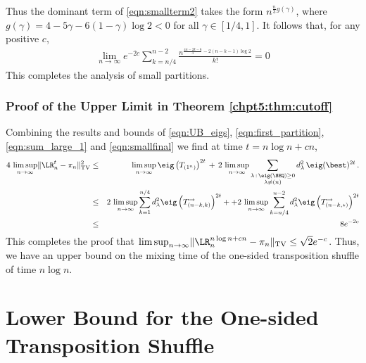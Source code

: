 \documentclass[11pt]{report}
\begin{document}
Thus the dominant term 
of \eqref{eqn:smallterm2} takes the form $n^{\frac{n}{3}g(\gamma)}$,
where $g(\gamma) = 4-5\gamma - 6(1-\gamma)\log 2 < 0$ for all
$\gamma\in[1/4,1]$. It follows that, for any positive $c$, 
\begin{eqnarray}
\lim_{n\rightarrow \infty} e^{-2c}\sum_{k =n/4}^{n-2} 
\frac{n^{\frac{4n-2k-6}{3}-2(n-k-1)\log 2}}{k!} =0 \label{eqn:smallfinal}
\end{eqnarray}	
This completes the analysis of small partitions.


\subsubsection*{Proof of the Upper Limit in Theorem \ref{chpt5:thm:cutoff}}
Combining the results and bounds of \eqref{eqn:UB_eigs}, 
\eqref{eqn:first_partition}, \eqref{eqn:sum_large_1} and 
\eqref{eqn:smallfinal} we find at time $t=n\log n +cn$, 
\begin{eqnarray*}
	4 \,\limsup_{n\to \infty}\lVert \LR^{t}_{n} -\pi_{n} \rVert_{\tiny \textnormal{TV}}^{2} 
	& \leq & \limsup_{n\to \infty}
	\eig\left(T_{(1^n)}\right)^{2t} \,+ \,
	2\,\limsup_{n\to\infty} \sum_{\substack{\lambda\,:\,\eig(\SEQ) \geq 0\\ 
			\lambda \neq (n)}} 
	d_{\lambda}^{2}  \,	\eig(\best)^{2t} \,. \\
	&\leq & 2\,\limsup_{n\to\infty} \sum_{k=1}^{n/4} 
	d_{\lambda}^{2} \eig\left(T_{(n-k,k)}^{\rightarrow}\right)^{2t} +
	+ 2\,\limsup_{n\to\infty} \sum_{k=n/4}^{n-2} 
	d_{\lambda}^{2} \eig\left(T_{(n-k,\star)}^{\rightarrow}\right)^{2t}\\
	& \leq & 8e^{-2c}
\end{eqnarray*}
This completes the proof that   $\limsup_{n\to \infty} \lVert \LR^{n\log n +cn}_{n} -\pi_{n} 
\rVert_{\tiny \textnormal{TV}} \leq \sqrt{2}e^{-c}$. Thus, we have an upper bound on the mixing time of the one-sided transposition shuffle of time $n\log n$.



















\section{Lower Bound for the One-sided Transposition Shuffle}
\label{chpt5:sec:lowerbound}
\end{document}
